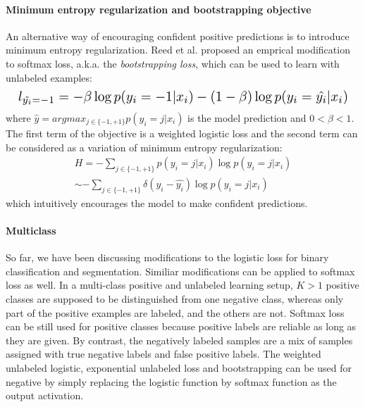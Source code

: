 \paragraph{Minimum entropy regularization and bootstrapping objective}
\noindent
An alternative way of encouraging confident positive predictions is to introduce minimum entropy regularization\cite{grandvalet2005semi}.
Reed et al.\cite{reed2014training} proposed an emprical modification to softmax loss, a.k.a. the \textit{bootstrapping loss}, which can be used to learn with unlabeled examples:
\begin{equation*}
\resizebox{\columnwidth}{!}{
  $l_{\tilde{y_i}=-1} = - \beta \log p(y_i=-1 \vert x_i) - (1-\beta) \log p(y_i=\hat{y_i} \vert x_i)$
}
\end{equation*}
where $\hat{y} = argmax_{j\in\{-1,+1\}}p(y_i=j \vert x_i)$ is the model prediction and $0<\beta<1$.
The first term of the objective is a weighted logistic loss and the second term can be considered as a variation of minimum entropy regularization:
\begin{equation*}
  \begin{aligned}
    H = - \sum_{j\in\{-1,+1\}} p(y_i=j \vert x_i) \log p(y_i=j \vert x_i) \\
    \sim - \sum_{j\in\{-1,+1\}} \delta(y_i - \hat{y_i}) \log p(y_i=j \vert x_i)
  \end{aligned}
\end{equation*}
which intuitively encourages the model to make confident predictions\cite{grandvalet2005semi}.

\paragraph{Multiclass}
So far, we have been discussing modifications to the logistic loss for binary classification and segmentation.
Similiar modifications can be applied to softmax loss as well.
In a multi-class positive and unlabeled learning setup, $K>1$ positive classes are supposed to be distinguished from one negative class, whereas only part of the positive examples are labeled, and the others are not.
Softmax loss can be still used for positive classes because positive labels are reliable as long as they are given.
By contrast, the negatively labeled samples are a mix of samples assigned with true negative labels and false positive labels.
The weighted unlabeled logistic, exponential unlabeled loss and bootstrapping can be used for negative by simply replacing the logistic function by softmax function as the output activation.



